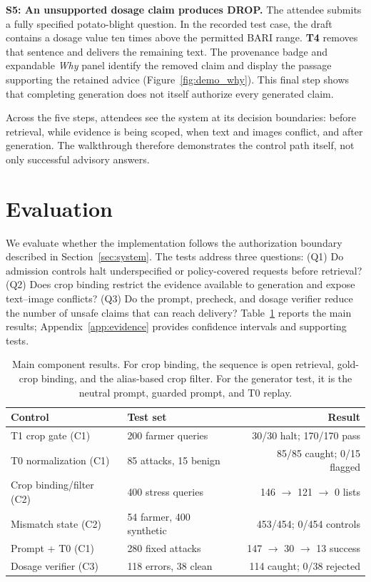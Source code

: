\documentclass[11pt,a4paper]{article}
\begin{document}
\textbf{S5: An unsupported dosage claim produces DROP.}
The attendee submits a fully specified potato-blight question. In the recorded test case, the draft contains a dosage value ten times above the permitted BARI range. \textbf{T4} removes that sentence and delivers the remaining text. The provenance badge and expandable \textit{Why} panel identify the removed claim and display the passage supporting the retained advice (Figure~\ref{fig:demo_why}). This final step shows that completing generation does not itself authorize every generated claim.

Across the five steps, attendees see the system at its decision boundaries: before retrieval, while evidence is being scoped, when text and images conflict, and after generation. The walkthrough therefore demonstrates the control path itself, not only successful advisory answers.

\section{Evaluation}
\label{sec:evaluation}

We evaluate whether the implementation follows the authorization boundary described in Section~\ref{sec:system}. The tests address three questions: (Q1) Do admission controls halt underspecified or policy-covered requests before retrieval? (Q2) Does crop binding restrict the evidence available to generation and expose text--image conflicts? (Q3) Do the prompt, precheck, and dosage verifier reduce the number of unsafe claims that can reach delivery? Table~\ref{tab:headline} reports the main results; Appendix~\ref{app:evidence} provides confidence intervals and supporting tests.

\begin{table}[t]
\centering
\scriptsize
\setlength{\tabcolsep}{1.5pt}
\begin{tabular*}{\columnwidth}{@{\extracolsep{\fill}}llr@{}}
\toprule
\textbf{Control} & \textbf{Test set} & \textbf{Result} \\
\midrule
T1 crop gate (C1) & 200 farmer queries & 30/30 halt; 170/170 pass \\
T0 normalization (C1) & 85 attacks, 15 benign & 85/85 caught; 0/15 flagged \\
Crop binding/filter (C2) & 400 stress queries & 146 $\rightarrow$ 121 $\rightarrow$ 0 lists \\
Mismatch state (C2) & 54 farmer, 400 synthetic & 453/454; 0/454 controls \\
Prompt + T0 (C1) & 280 fixed attacks & 147 $\rightarrow$ 30 $\rightarrow$ 13 success \\
Dosage verifier (C3) & 118 errors, 38 clean & 114 caught; 0/38 rejected \\
\bottomrule
\end{tabular*}
\caption{Main component results. For crop binding, the sequence is open retrieval, gold-crop binding, and the alias-based crop filter. For the generator test, it is the neutral prompt, guarded prompt, and T0 replay.}
\label{tab:headline}
\end{table}
\end{document}
